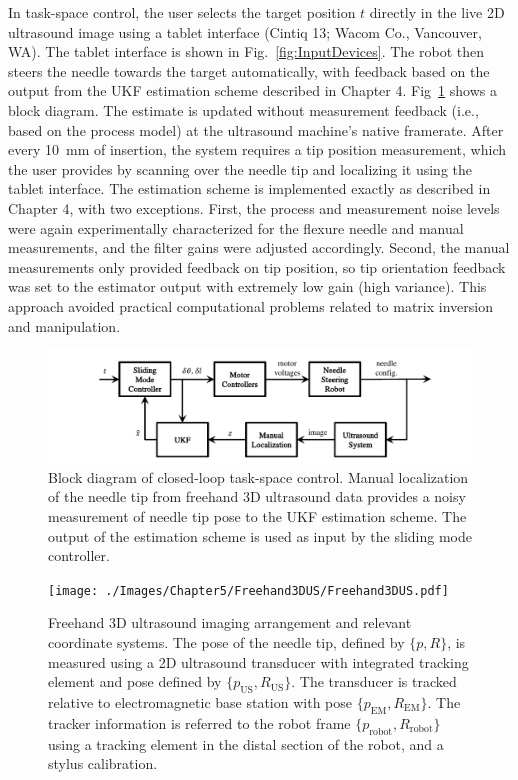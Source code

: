 In task-space control, the user selects the target position $t$ directly in the live 2D ultrasound image using a tablet interface (Cintiq 13; Wacom Co., Vancouver, WA). The tablet interface is shown in Fig.~\ref{fig:InputDevices}. The robot then steers the needle towards the target automatically, with feedback based on the output from the UKF estimation scheme described in Chapter 4. Fig~\ref{fig:ClinicalBlockDiagram} shows a block diagram. The estimate is updated without measurement feedback (i.e., based on the process model) at the ultrasound machine's native framerate. After every 10~mm of insertion, the system requires a tip position measurement, which the user provides by scanning over the needle tip and localizing it using the tablet interface. The estimation scheme is implemented exactly as described in Chapter 4, with two exceptions. First, the process and measurement noise levels were again experimentally characterized for the flexure needle and manual measurements, and the filter gains were adjusted accordingly. Second, the manual measurements only provided feedback on tip position, so tip orientation feedback was set to the estimator output with extremely low gain (high variance). This approach avoided practical computational problems related to matrix inversion and manipulation. 

\begin{figure}[!t]
\centering
\includegraphics[width=\columnwidth]{Images/Chapter5/ClinicalBlockDiagram/ClinicalBlockDiagram}%
\caption[Block diagram of closed-loop task-space control algorithm]{Block diagram of closed-loop task-space control. Manual localization of the needle tip from freehand 3D ultrasound data provides a noisy measurement of needle tip pose to the UKF estimation scheme. The output of the estimation scheme is used as input by the sliding mode controller.}
\label{fig:ClinicalBlockDiagram}
\end{figure}

\begin{figure}[!t]
\centering
\texttt{[image: ./Images/Chapter5/Freehand3DUS/Freehand3DUS.pdf]}%
\caption[Freehand 3D ultrasound imaging arrangement]{Freehand 3D ultrasound imaging arrangement and relevant coordinate systems. The pose of the needle tip, defined by $\{p,R\}$, is measured using a 2D ultrasound transducer with integrated tracking element and pose defined by $\{p_{\text{US}},R_{\text{US}}\}$. The transducer is tracked relative to electromagnetic base station with pose $\{p_{\text{EM}},R_{\text{EM}}\}$. The tracker information is referred to the robot frame $\{p_{\text{robot}},R_{\text{robot}}\}$ using a tracking element in the distal section of the robot, and a stylus calibration.}
\label{fig:freehand3DUS}
\end{figure}

